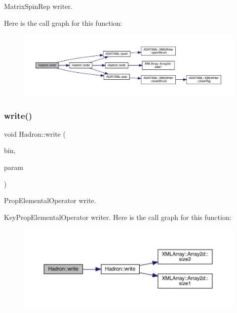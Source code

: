 Matrix\+Spin\+Rep writer. 

Here is the call graph for this function\+:\nopagebreak
\begin{figure}[H]
\begin{center}
\leavevmode
\includegraphics[width=350pt]{d1/daf/namespaceHadron_a433908e65befd36f268196398b8469c7_cgraph}
\end{center}
\end{figure}
\mbox{\label{namespaceHadron_a2d77dd144d88ef6a060cca397fb32373}} 
\subsubsection{\texorpdfstring{write()}{write()}\hspace{0.1cm}{\footnotesize\ttfamily [20/95]}}
{\footnotesize\ttfamily void Hadron\+::write (\begin{DoxyParamCaption}\item[{\mbox{\hyperlink{classADATIO_1_1BinaryWriter}{Binary\+Writer}} \&}]{bin,  }\item[{const \mbox{\hyperlink{structHadron_1_1KeyPropElementalOperator__t}{Key\+Prop\+Elemental\+Operator\+\_\+t}} \&}]{param }\end{DoxyParamCaption})}



Prop\+Elemental\+Operator write. 

Key\+Prop\+Elemental\+Operator writer. Here is the call graph for this function\+:\nopagebreak
\begin{figure}[H]
\begin{center}
\leavevmode
\includegraphics[width=350pt]{d1/daf/namespaceHadron_a2d77dd144d88ef6a060cca397fb32373_cgraph}
\end{center}
\end{figure}
\mbox{\label{namespaceHadron_a67e12d192d662851e588e9f3504ec45e}} 

